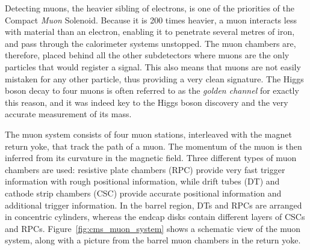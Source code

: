 Detecting muons, the heavier sibling of electrons, is one of the priorities of the Compact
\textit{Muon} Solenoid. Because it is 200 times heavier, a muon interacts less with material than
an electron, enabling it to penetrate several metres of iron, and pass through the calorimeter
systems unstopped. The muon chambers are, therefore, placed behind all the other subdetectors
where muons are the only particles that would register a signal. 
This also means that muons are not easily mistaken for any other particle, thus providing a very
clean signature. The Higgs boson decay to four muons is often referred to as the \textit{golden
channel} for exactly this reason, and it was indeed key to the Higgs boson discovery and the very
accurate measurement of its mass. 

The muon system consists of four muon stations, interleaved with the magnet return yoke, that track
the path of a muon. The momentum of the muon is then inferred from its curvature in the magnetic
field. Three different types of muon chambers are used: resistive plate chambers (RPC) provide 
very fast trigger information with rough positional information, while drift tubes (DT) and cathode
strip chambers (CSC) provide accurate positional information and additional trigger information.
In the barrel region, DTs and RPCs are arranged in concentric cylinders, whereas the endcap disks
contain different layers of CSCs and RPCs. Figure~\ref{fig:cms_muon_system} shows a schematic view
of the muon system, along with a picture from the barrel muon chambers in the return yoke. 

